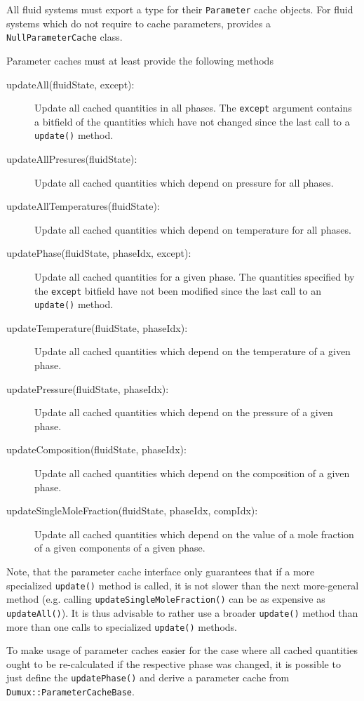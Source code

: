 All fluid systems must export a type for their \texttt{Parameter}
cache objects. For fluid systems which do not require to cache
parameters, \Dumux provides a \texttt{NullParameterCache} class.

Parameter caches must at least provide the following methods
\begin{description}
\item[updateAll(fluidState, except):] Update all cached quantities in
  all phases. The \texttt{except} argument contains a bitfield of the
  quantities which have not changed since the last call to a
  \texttt{update()} method.
  \item[updateAllPresures(fluidState):]
    Update all cached quantities which depend on pressure for
    all phases.
  \item[updateAllTemperatures(fluidState):]
    Update all cached quantities which depend on temperature for
    all phases.
  \item[updatePhase(fluidState, phaseIdx, except):] Update all cached
    quantities for a given phase. The quantities specified by the
    \texttt{except} bitfield have not been modified since the last
    call to an \texttt{update()} method.
  \item[updateTemperature(fluidState, phaseIdx):] Update all cached
    quantities which depend on the temperature of a given phase.
  \item[updatePressure(fluidState, phaseIdx):] Update all cached
    quantities which depend on the pressure of a given phase.
  \item[updateComposition(fluidState, phaseIdx):] Update all cached
    quantities which depend on the composition of a given phase.
  \item[updateSingleMoleFraction(fluidState, phaseIdx, compIdx):]
    Update all cached quantities which depend on the value of a mole
    fraction of a given components of a given phase.
\end{description}
Note, that the parameter cache interface only guarantees that if a
more specialized \texttt{update()} method is called, it is not slower
than the next more-general method (e.g. calling
\texttt{updateSingleMoleFraction()} can be as expensive as
\texttt{updateAll()}). It is thus advisable to rather use a broader
\texttt{update()} method than more than one calls to specialized
\texttt{update()} methods.

To make usage of parameter caches easier for the case where all cached
quantities ought to be re-calculated if the respective phase was
changed, it is possible to just define the \texttt{updatePhase()} and
derive a parameter cache from \texttt{Dumux::ParameterCacheBase}.

